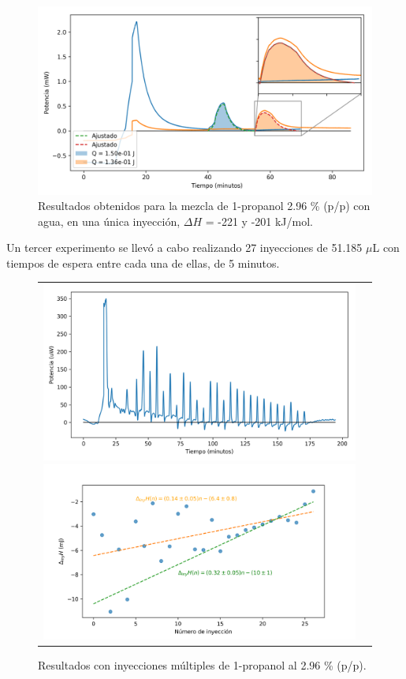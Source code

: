 \documentclass[a0]{sciposter}
\newcommand{\figwidth}{0.7\linewidth}
\begin{document}
\begin{multicols}{3}
	\begin{figure}[h]
		\centering
		\includegraphics[width=\figwidth]{../Data/ChemicalCalibrations/singlePropanol}
		\caption{Resultados obtenidos para la mezcla de 1-propanol 2.96 \% (p/p) con agua, en una \'unica inyecci\'on, $\Delta H$ = -221 y -201 kJ/mol.}
	\end{figure}

	Un tercer experimento se llev\'o a cabo realizando 27 inyecciones de 51.185 $\mu$L con tiempos de espera entre cada una de ellas, de 5 minutos.
	
	\begin{figure}[h]
		\centering
		\begin{tabular}{cc}
			\includegraphics[width=0.47\linewidth]{../Data/ChemicalCalibrations/multiple}
			\includegraphics[width=0.53\linewidth]{../Data/ChemicalCalibrations/multipleInt}
		\end{tabular}
		\caption{Resultados con inyecciones m\'ultiples de 1-propanol al 2.96 \% (p/p).}
	\end{figure}


\end{multicols}
\end{document}
